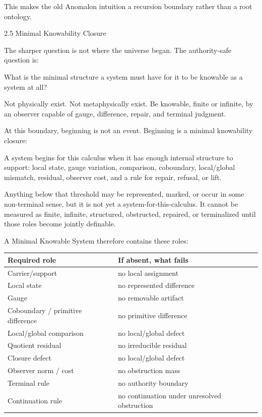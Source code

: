 \documentclass[
  10pt,
]{article}
\newenvironment{Shaded}{}{}
\newcommand{\NormalTok}[1]{#1}
\begin{document}
This makes the old Anomalon intuition a recursion boundary rather than a root ontology.

2.5 Minimal Knowability Closure

The sharper question is not where the universe began. The authority-safe question is:

\begin{Shaded}
\begin{Highlighting}[]
\NormalTok{What is the minimal structure a system must have for it to be knowable as a system at all?}
\end{Highlighting}
\end{Shaded}

Not physically exist. Not metaphysically exist. Be knowable, finite or infinite, by an observer capable of gauge, difference, repair, and terminal judgment.

At this boundary, beginning is not an event. Beginning is a minimal knowability closure:

\begin{Shaded}
\begin{Highlighting}[]
\NormalTok{A system begins for this calculus when it has enough internal structure to support:}
\NormalTok{local state,}
\NormalTok{gauge variation,}
\NormalTok{comparison,}
\NormalTok{coboundary,}
\NormalTok{local/global mismatch,}
\NormalTok{residual,}
\NormalTok{observer cost,}
\NormalTok{and a rule for repair, refusal, or lift.}
\end{Highlighting}
\end{Shaded}

Anything below that threshold may be represented, marked, or occur in some non-terminal sense, but it is not yet a system-for-this-calculus. It cannot be measured as finite, infinite, structured, obstructed, repaired, or terminalized until those roles become jointly definable.

A Minimal Knowable System therefore contains these roles:

\begin{longtable}[]{@{}ll@{}}
\toprule\noalign{}
Required role & If absent, what fails \\
\midrule\noalign{}
\endhead
\bottomrule\noalign{}
\endlastfoot
Carrier/support & no local assignment \\
Local state & no represented difference \\
Gauge & no removable artifact \\
Coboundary / primitive difference & no primitive difference \\
Local/global comparison & no local/global defect \\
Quotient residual & no irreducible residual \\
Closure defect & no local/global defect \\
Observer norm / cost & no obstruction mass \\
Terminal rule & no authority boundary \\
Continuation rule & no continuation under unresolved obstruction \\
\end{longtable}
\end{document}
